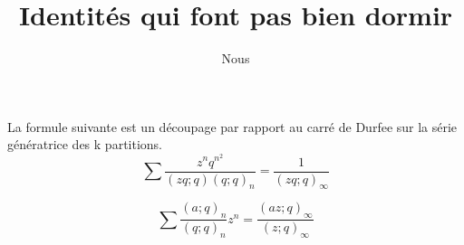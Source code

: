 \documentclass[a4paper,11pt]{article}
\title{Identités qui font pas bien dormir}
\author{Nous}
\begin{document}
\maketitle
La formule suivante est un découpage par rapport au carré de Durfee sur la série
génératrice des k partitions.
$$\sum \frac{z^nq^{n^2}}{(zq;q)(q;q)_n}=\frac{1}{(zq;q)_\infty}$$

$$\sum \frac{(a;q)_n}{(q;q)_n}z^n=\frac{(az;q)_\infty}{(z;q)_\infty}$$





\end{document}
